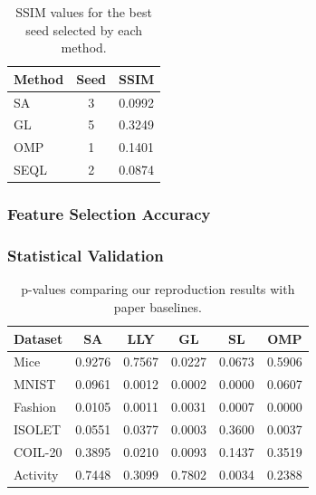 \documentclass[a4paper,twocolumn]{article} %
\begin{document}
\begin{table}[ht]
    \centering
    \begin{tabular}{lcc}
        \hline
        \textbf{Method} & \textbf{Seed} & \textbf{SSIM} \\
        \hline
        SA    & 3 & 0.0992 \\
        GL    & 5 & 0.3249 \\
        OMP   & 1 & 0.1401 \\
        SEQL  & 2 & 0.0874 \\
        \hline
    \end{tabular}
    \caption{SSIM values for the best seed selected by each method.}
    \label{tab:ssim_results}
\end{table}


\subsubsection{Feature Selection Accuracy}
\subsubsection{Statistical Validation}
\begin{table}[ht]
\centering
\scriptsize
\begin{tabular}{lccccc}
\hline
\textbf{Dataset} & \textbf{SA} & \textbf{LLY} & \textbf{GL} & \textbf{SL} & \textbf{OMP} \\
\hline
Mice     & 0.9276 & 0.7567 & 0.0227 & 0.0673 & 0.5906 \\
MNIST    & 0.0961 & 0.0012 & 0.0002 & 0.0000 & 0.0607 \\
Fashion  & 0.0105 & 0.0011 & 0.0031 & 0.0007 & 0.0000 \\
ISOLET   & 0.0551 & 0.0377 & 0.0003 & 0.3600 & 0.0037 \\
COIL-20  & 0.3895 & 0.0210 & 0.0093 & 0.1437 & 0.3519 \\
Activity & 0.7448 & 0.3099 & 0.7802 & 0.0034 & 0.2388 \\
\hline
\end{tabular}
\caption{p-values comparing our reproduction results with paper baselines.}
\label{tab:pvalue-comparison}
\end{table}
\end{document}
